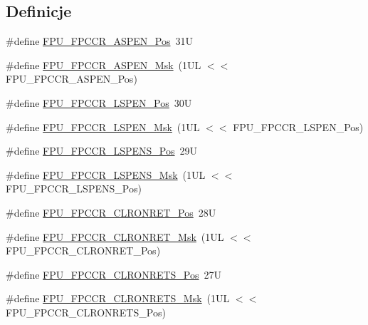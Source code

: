 \subsection*{Definicje}
\begin{DoxyCompactItemize}
\item 
\#define \hyperlink{group___c_m_s_i_s___f_p_u_ga4228a923ddf665f868e56b4b9e9bff7b}{F\+P\+U\+\_\+\+F\+P\+C\+C\+R\+\_\+\+A\+S\+P\+E\+N\+\_\+\+Pos}~31U
\item 
\#define \hyperlink{group___c_m_s_i_s___f_p_u_ga309886ff6bbd25cb13c061c6683c6c0c}{F\+P\+U\+\_\+\+F\+P\+C\+C\+R\+\_\+\+A\+S\+P\+E\+N\+\_\+\+Msk}~(1\+U\+L $<$$<$ F\+P\+U\+\_\+\+F\+P\+C\+C\+R\+\_\+\+A\+S\+P\+E\+N\+\_\+\+Pos)
\item 
\#define \hyperlink{group___c_m_s_i_s___f_p_u_gac7d70e051fe759ad8fed83bf5b5aebc1}{F\+P\+U\+\_\+\+F\+P\+C\+C\+R\+\_\+\+L\+S\+P\+E\+N\+\_\+\+Pos}~30U
\item 
\#define \hyperlink{group___c_m_s_i_s___f_p_u_gaf4ab19de45df6522dd882bc116f938e9}{F\+P\+U\+\_\+\+F\+P\+C\+C\+R\+\_\+\+L\+S\+P\+E\+N\+\_\+\+Msk}~(1\+U\+L $<$$<$ F\+P\+U\+\_\+\+F\+P\+C\+C\+R\+\_\+\+L\+S\+P\+E\+N\+\_\+\+Pos)
\item 
\#define \hyperlink{group___c_m_s_i_s___f_p_u_ga705368bf3c52b5bb4edfbcb3e2631e1c}{F\+P\+U\+\_\+\+F\+P\+C\+C\+R\+\_\+\+L\+S\+P\+E\+N\+S\+\_\+\+Pos}~29U
\item 
\#define \hyperlink{group___c_m_s_i_s___f_p_u_ga73afcf0fe09c69e9625e11035cabb1c0}{F\+P\+U\+\_\+\+F\+P\+C\+C\+R\+\_\+\+L\+S\+P\+E\+N\+S\+\_\+\+Msk}~(1\+U\+L $<$$<$ F\+P\+U\+\_\+\+F\+P\+C\+C\+R\+\_\+\+L\+S\+P\+E\+N\+S\+\_\+\+Pos)
\item 
\#define \hyperlink{group___c_m_s_i_s___f_p_u_ga0b97b2fdac794f4fddab1e4342e0c104}{F\+P\+U\+\_\+\+F\+P\+C\+C\+R\+\_\+\+C\+L\+R\+O\+N\+R\+E\+T\+\_\+\+Pos}~28U
\item 
\#define \hyperlink{group___c_m_s_i_s___f_p_u_gadedc12ec237657721a613c6f47abed6f}{F\+P\+U\+\_\+\+F\+P\+C\+C\+R\+\_\+\+C\+L\+R\+O\+N\+R\+E\+T\+\_\+\+Msk}~(1\+U\+L $<$$<$ F\+P\+U\+\_\+\+F\+P\+C\+C\+R\+\_\+\+C\+L\+R\+O\+N\+R\+E\+T\+\_\+\+Pos)
\item 
\#define \hyperlink{group___c_m_s_i_s___f_p_u_gabb18ccf9d1b0a4bef3b0823f18eb96ba}{F\+P\+U\+\_\+\+F\+P\+C\+C\+R\+\_\+\+C\+L\+R\+O\+N\+R\+E\+T\+S\+\_\+\+Pos}~27U
\item 
\#define \hyperlink{group___c_m_s_i_s___f_p_u_ga103d932807c15250d96711952878eeb2}{F\+P\+U\+\_\+\+F\+P\+C\+C\+R\+\_\+\+C\+L\+R\+O\+N\+R\+E\+T\+S\+\_\+\+Msk}~(1\+U\+L $<$$<$ F\+P\+U\+\_\+\+F\+P\+C\+C\+R\+\_\+\+C\+L\+R\+O\+N\+R\+E\+T\+S\+\_\+\+Pos)
$$
\end{DoxyCompactItemize}
